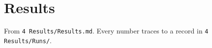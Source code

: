 \section{Results}
\label{sec:results}

From \texttt{4 Results/Results.md}. Every number traces to a record in
\texttt{4 Results/Runs/}.
